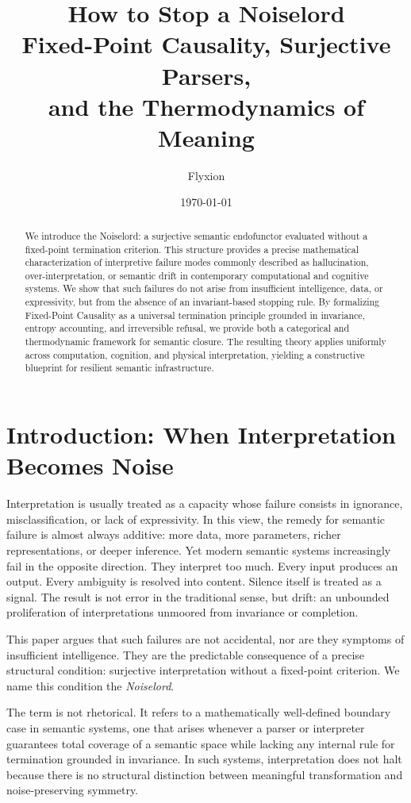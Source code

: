 \documentclass[12pt]{article}
\title{\textbf{How to Stop a Noiselord}\\
Fixed-Point Causality, Surjective Parsers,\\
and the Thermodynamics of Meaning}
\author{Flyxion}
\date{\today}
\theoremstyle{remark}
\begin{document}
\maketitle

\begin{abstract}
We introduce the Noiselord: a surjective semantic endofunctor evaluated without a fixed-point termination criterion. This structure provides a precise mathematical characterization of interpretive failure modes commonly described as hallucination, over-interpretation, or semantic drift in contemporary computational and cognitive systems. We show that such failures do not arise from insufficient intelligence, data, or expressivity, but from the absence of an invariant-based stopping rule. By formalizing Fixed-Point Causality as a universal termination principle grounded in invariance, entropy accounting, and irreversible refusal, we provide both a categorical and thermodynamic framework for semantic closure. The resulting theory applies uniformly across computation, cognition, and physical interpretation, yielding a constructive blueprint for resilient semantic infrastructure.
\end{abstract}

\section{Introduction: When Interpretation Becomes Noise}

Interpretation is usually treated as a capacity whose failure consists in ignorance, misclassification, or lack of expressivity. In this view, the remedy for semantic failure is almost always additive: more data, more parameters, richer representations, or deeper inference. Yet modern semantic systems increasingly fail in the opposite direction. They interpret too much. Every input produces an output. Every ambiguity is resolved into content. Silence itself is treated as a signal. The result is not error in the traditional sense, but drift: an unbounded proliferation of interpretations unmoored from invariance or completion.

This paper argues that such failures are not accidental, nor are they symptoms of insufficient intelligence. They are the predictable consequence of a precise structural condition: surjective interpretation without a fixed-point criterion. We name this condition the \emph{Noiselord}.

The term is not rhetorical. It refers to a mathematically well-defined boundary case in semantic systems, one that arises whenever a parser or interpreter guarantees total coverage of a semantic space while lacking any internal rule for termination grounded in invariance. In such systems, interpretation does not halt because there is no structural distinction between meaningful transformation and noise-preserving symmetry.
\end{document}
